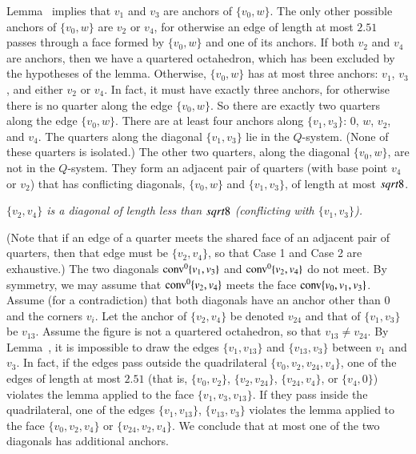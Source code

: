 \begin{tarskidata}
\begin{tarski}
\begin{proved}
Lemma~ implies that $v_1$ and $v_3$ are
anchors of $\{v_0,w\}$. The only other possible anchors of $\{v_0,w\}$
are $v_2$ or $v_4$, for otherwise an edge of length at most $2.51$
passes through a face formed by $\{v_0,w\}$ and one of its anchors.
If both $v_2$ and $v_4$ are anchors, then we have a quartered
octahedron, which has been excluded by the hypotheses of the
lemma. Otherwise, $\{v_0,w\}$ has at most three anchors: $v_1$,
$v_3$, and either $v_2$ or $v_4$. In fact, it must have exactly
three anchors, for otherwise there is no quarter along the edge
$\{v_0,w\}$. So there are exactly two quarters along the edge
$\{v_0,w\}$. There are at least four anchors along $\{v_1,v_3\}$:
$0$, $w$, $v_2$, and $v_4$. The quarters along the diagonal
$\{v_1,v_3\}$ lie in the $Q$-system. (None of these quarters is
isolated.)  The other two quarters, along the diagonal $\{v_0,w\}$,
are not in the $Q$-system. They form an adjacent pair of quarters
(with base point $v_4$ or $v_2$) that has conflicting diagonals,
$\{v_0,w\}$ and $\{v_1,v_3\}$, of length at most $sqrt8$.

  {\it $\{v_2,v_4\}$ is a diagonal of
length less than $sqrt8$ (conflicting with $\{v_1,v_3\}$).}

(Note that if an edge of a quarter meets the shared face
of an adjacent pair of quarters, then that edge must be
$\{v_2,v_4\}$, so that Case 1 and Case 2 are exhaustive.) The two
diagonals ${\operatorname{conv}}^0\{v_1,v_3\}$ and ${\operatorname{conv}}^0\{v_2,v_4\}$ 
do not meet. By
symmetry, we may assume that ${\operatorname{conv}}^0\{v_2,v_4\}$ meets the face
${\operatorname{conv}}\{v_0,v_1,v_3\}$. Assume (for a contradiction) that both diagonals
have an anchor other than $0$ and the corners $v_i$. Let the
anchor of $\{v_2,v_4\}$ be denoted $v_{24}$ and that of
$\{v_1,v_3\}$ be $v_{13}$. Assume the figure is not a quartered
octahedron, so that $v_{13}\ne v_{24}$. By
Lemma~, it is impossible to
draw the edges $\{v_1,v_{13}\}$ and $\{v_{13},v_3\}$ between $v_1$
and $v_3$.  In fact, if the edges pass outside the quadrilateral
$\{v_0,v_2,v_{24},v_4\}$, one of the edges of length at most $2.51$
(that is,
    $\{v_0,v_2\}$, $\{v_2,v_{24}\}$, $\{v_{24},v_4\}$,
or $\{v_4,0\}$) violates the lemma applied to the face
$\{v_1,v_3,v_{13}\}$. If they pass inside the quadrilateral, one
of the edges $\{v_1,v_{13}\}$, $\{v_{13},v_3\}$ violates the lemma
applied to the face
    $\{v_0,v_{2},v_4\}$ or $\{v_{24},v_2,v_4\}$.
We conclude that at most one of the two diagonals has additional
anchors.


\end{proved}
\end{tarski}
\end{tarskidata}
